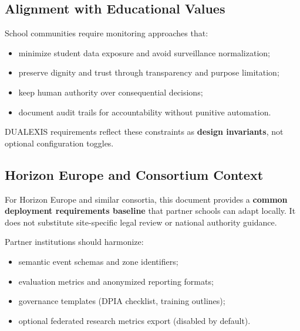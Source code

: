 \subsection{Alignment with Educational Values}

School communities require monitoring approaches that:
\begin{itemize}[noitemsep]
  \item minimize student data exposure and avoid surveillance normalization;
  \item preserve dignity and trust through transparency and purpose limitation;
  \item keep human authority over consequential decisions;
  \item document audit trails for accountability without punitive automation.
\end{itemize}

DUALEXIS requirements reflect these constraints as \textbf{design invariants}, not
optional configuration toggles.

\subsection{Horizon Europe and Consortium Context}

For Horizon Europe and similar consortia, this document provides a \textbf{common deployment
requirements baseline} that partner schools can adapt locally.
It does not substitute site-specific legal review or national authority guidance.

Partner institutions should harmonize:
\begin{itemize}[noitemsep]
  \item semantic event schemas and zone identifiers;
  \item evaluation metrics and anonymized reporting formats;
  \item governance templates (DPIA checklist, training outlines);
  \item optional federated research metrics export (disabled by default).
\end{itemize}
